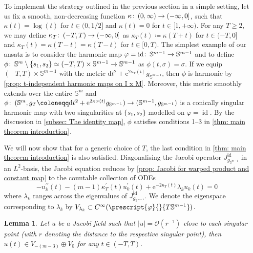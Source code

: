 \documentclass{article}
\numberwithin{equation}{section}        %
\theoremstyle{bfnote}
\newtheorem{lem}[thm]{Lemma}                %
\theoremstyle{definition}
\theoremstyle{bfremark}
\newcommand{\col}{\colon \thinspace}        %
\newcommand{\Sp}{\mathbb{S}}                %
\newcommand{\diff}{\mathrm{d}}                      %
\DeclareMathOperator{\id}{id}                   %
\begin{document}
To implement the strategy outlined in the previous section in a simple setting, let us fix a smooth, non-decreasing function $\kappa \col (0,\infty) \rightarrow (-\infty, 0]$, such that $\kappa(t) = \log(t)$ for $t \in (0,1/2]$ and $\kappa(t) = 0$ for $t \in [1,+\infty)$. For any $T \geq 2$, we may define $\kappa_T \col (-T,T) \rightarrow (-\infty,0]$ as $\kappa_T(t) \coloneqq \kappa(T+t)$ for $t \in (-T,0]$ and $\kappa_T(t) = \kappa(T-t) = \kappa(T-t)$ for $t \in [0,T)$. The simplest example of our ansatz is to consider the harmonic map $\varphi = \id \col \Sp^{m-1} \rightarrow \Sp^{m-1}$ and to define $\phi \col \Sp^m\setminus \{s_1,s_2\} \simeq (-T,T) \times \Sp^{m-1} \to \Sp^{m-1}$ as $\phi(t,\sigma) = \sigma$. If we equip $(-T,T) \times \Sp^{m-1}$ with the metric $\diff t^2 + \mathrm{e}^{2\kappa_T(t)}g_{\Sp^{m-1}}$, then $\phi$ is harmonic by \cref{prop: t-independent harmonic maps on I x M}. Moreover, this metric smoothly extends over the entire $\Sp^m$ and $\phi \col (\Sp^m, g_T \coloneqq \diff t^2 + \mathrm{e}^{2\kappa_T(t)}g_{\Sp^{m-1}}) \to (\Sp^{m-1},g_{\Sp^{m-1}})$ is a conically singular harmonic map with two singularities at $\{s_1,s_2\}$ modelled on $\varphi = \id$. By the discussion in \cref{subsec: The identity map}, $\phi$ satisfies conditions 1--3 in \cref{thm: main theorem introduction}.

We will now show that for a generic choice of $T$, the last condition in \cref{thm: main theorem introduction} is also satisfied. Diagonalising the Jacobi operator $J^{\id}_{g_{\Sp^{m-1}}}$ in an $L^2$-basis, the Jacobi equation reduces by \cref{prop: Jacobi for warped product and constant map} to the countable collection of ODEs
\begin{equation}    \label{eq: id example Jacobi ODE in Vk}
    - u_k^{\prime\prime}(t) - (m-1) \kappa_T^\prime(t) u_k^\prime(t) + \mathrm{e}^{-2\kappa_T(t)} \lambda_k u_k(t) = 0
\end{equation}
where $\lambda_k$ ranges across the eigenvalues of $J^{\id}_{g_{\Sp^{m-1}}}$. We denote the eigenspace corresponding to $\lambda_k$ by $V_{\lambda_k} \subset C^{\infty}(\prescript{\varphi}{}{T\Sp^{m-1}})$.

\begin{lem}
    Let $u$ be a Jacobi field such that $|u| = \mathcal{O}(r^{-1})$ close to each singular point (with $r$ denoting the distance to the respective singular point), then $u(t) \in V_{-(m-3)} \oplus V_0$ for any $t \in (-T,T)$.
\end{lem}
\end{document}
